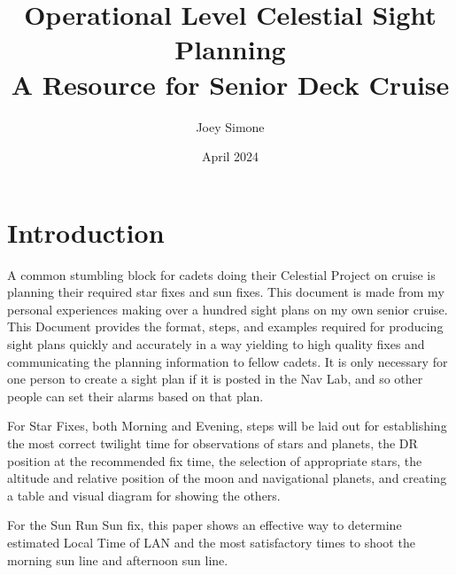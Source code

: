 \documentclass{article}
\title{Operational Level Celestial Sight Planning \\
\large A Resource for Senior Deck Cruise}
\author{Joey Simone}
\date{April 2024} %
\begin{document}
\maketitle

\section*{Introduction}

A common stumbling block for cadets doing their Celestial Project on cruise is planning their required star fixes and sun fixes. This document is made from my personal experiences making over a hundred sight plans on my own senior cruise. This Document provides the format, steps, and examples required for producing sight plans quickly and accurately in a way yielding to high quality fixes and communicating the planning information to fellow cadets. It is only necessary for one person to create a sight plan if it is posted in the Nav Lab, and so other people can set their alarms based on that plan.

For Star Fixes, both Morning and Evening, steps will be laid out for establishing the most correct twilight time for observations of stars and planets, the DR position at the recommended fix time, the selection of appropriate stars, the altitude and relative position of the moon and navigational planets, and creating a table and visual diagram for showing the others.

For the Sun Run Sun fix, this paper shows an effective way to determine estimated Local Time of LAN and the most satisfactory times to shoot the morning sun line and afternoon sun line.
\end{document}
